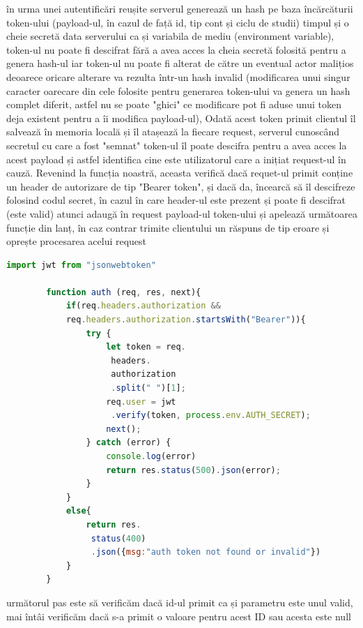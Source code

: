 \documentclass[12pt,a4paper,hidelinks]{report}
\theoremstyle{definition}
\theoremstyle{remark}
\begin{document}
    în urma unei autentificări reușite
    serverul generează un hash pe baza încărcăturii token-ului (payload-ul, în cazul de față id, tip cont și ciclu de studii)
    timpul și o cheie secretă data serverului ca și variabila de mediu (environment variable), token-ul nu poate fi descifrat
    fără a avea acces la cheia secretă  folosită pentru a genera hash-ul iar token-ul nu poate fi alterat de  către 
    un eventual actor malițios deoarece oricare alterare va rezulta într-un hash invalid
    (modificarea unui singur caracter oarecare din cele folosite pentru generarea token-ului va genera un hash complet diferit, astfel
    nu se poate "ghici" ce modificare pot fi aduse unui token deja existent pentru a îi modifica payload-ul), Odată acest token primit
    clientul îl salvează în memoria locală și îl atașează la fiecare request, serverul cunoscând secretul cu care a fost "semnat" token-ul
    îl poate descifra pentru a avea acces la acest payload și astfel identifica cine este utilizatorul care a inițiat request-ul în cauză.
    Revenind la funcția noastră, aceasta verifică dacă requet-ul primit conține un header de autorizare de tip "Bearer token",
    și dacă da, încearcă să îl descifreze folosind codul secret, în cazul în care header-ul este prezent și poate fi descifrat (este valid) atunci
    adaugă în request payload-ul token-ului și apelează următoarea funcție din lanț, în caz contrar trimite clientului un răspuns de tip eroare și oprește procesarea acelui request
    \begin{lstlisting}[language=Javascript]
        import jwt from "jsonwebtoken"

        function auth (req, res, next){
            if(req.headers.authorization &&
            req.headers.authorization.startsWith("Bearer")){
                try {
                    let token = req.
                     headers.
                     authorization
                     .split(" ")[1];
                    req.user = jwt
                     .verify(token, process.env.AUTH_SECRET);
                    next();
                } catch (error) {
                    console.log(error)
                    return res.status(500).json(error);
                }
            }
            else{
                return res.
                 status(400)
                 .json({msg:"auth token not found or invalid"})
            }
        }
    \end{lstlisting}
    următorul pas este să verificăm dacă id-ul primit ca și parametru este unul valid, mai întâi verificăm dacă s-a primit o valoare pentru acest ID sau acesta este null
\end{document}

